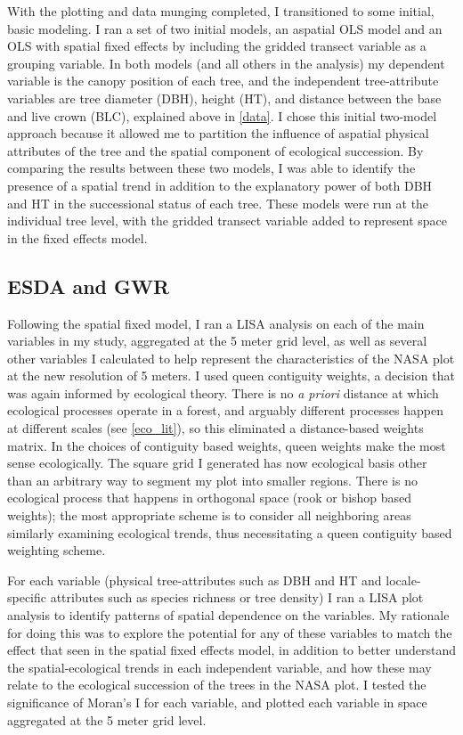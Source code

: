 \documentclass[12pt,a4paper]{article}
\begin{document}
With the plotting and data munging completed, I transitioned to some initial, basic modeling.  I ran a set of two initial models, an aspatial OLS model and an OLS with spatial fixed effects by including the gridded transect variable as a grouping variable.  In both models (and all others in the analysis) my dependent variable is the canopy position of each tree,  and the independent tree-attribute variables are tree diameter (DBH), height (HT), and distance between the base and live crown (BLC), explained above in \cref{data}.   I chose this initial two-model approach because it allowed me to partition the influence of aspatial physical attributes of the tree and the spatial component of ecological succession.  By comparing the results between these two models, I was able to identify the presence of a spatial trend in addition to the explanatory power of both DBH and HT in the successional status of each tree.  These models were run at the individual tree level, with the gridded transect variable added to represent space in the fixed effects model.

\subsection{ESDA and GWR}

Following the spatial fixed model, I ran a LISA analysis on each of the main variables in my study, aggregated at the 5 meter grid level, as well as several other variables I calculated to help represent the characteristics of the NASA plot at the new resolution of 5 meters.  I used queen contiguity weights, a decision that was again informed by ecological theory.  There is no \textit{a priori} distance at which ecological processes operate in a forest, and arguably different processes happen at different scales (see \cref{eco_lit}), so this eliminated a distance-based weights matrix.  In the choices of contiguity based weights, queen weights make the most sense ecologically.  The square grid I generated has now ecological basis other than an arbitrary way to segment my plot into smaller regions.  There is no ecological process that happens in orthogonal space (rook or bishop based weights); the most appropriate scheme is to consider all neighboring areas similarly examining ecological trends, thus necessitating a queen contiguity based weighting scheme.

For each variable (physical tree-attributes such as DBH and HT and locale-specific attributes such as species richness or tree density) I ran a LISA plot analysis to identify patterns of spatial dependence on the variables.  My rationale for doing this was to explore the potential for any of these variables to match the effect that seen in the spatial fixed effects model, in addition to better understand the spatial-ecological trends in each independent variable, and how these may relate to the ecological succession of the trees in the NASA plot.  I tested the significance of Moran's I for each variable, and plotted each variable in space aggregated at the 5 meter grid level.
\end{document}
